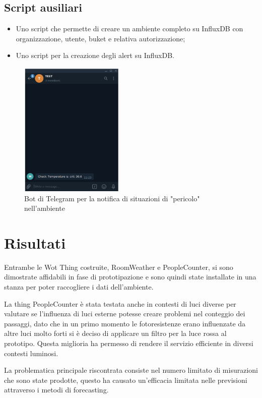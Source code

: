 \documentclass{article}
\begin{document}
\subsection{Script ausiliari}
\begin{itemize}
    \item Uno script che permette di creare un ambiente completo su InfluxDB con organizzazione, utente, buket e relativa autorizzazione;
    \item Uno script per la creazione degli alert su InfluxDB.
\end{itemize}



\begin{figure}
    \centering
    \includegraphics[width=5cm]{img/AlertBot.png}
    \caption{Bot di Telegram per la notifica di situazioni di "pericolo" nell'ambiente}
    \label{fig:influxForecast}
\end{figure}

\section{Risultati \label{section:risultati}}
Entrambe le Wot Thing costruite, RoomWeather e PeopleCounter, si sono dimostrate affidabili in fase di prototipazione e sono quindi state installate in una stanza per poter raccogliere i dati dell'ambiente. 
 
La thing PeopleCounter è stata testata anche in contesti di luci diverse per valutare se l'influenza di luci esterne potesse creare problemi nel conteggio dei passaggi, dato che in un primo momento le fotoresistenze erano influenzate da altre luci molto forti si è deciso di applicare un filtro per la luce rossa al prototipo. Questa miglioria ha permesso di rendere il servizio efficiente in diversi contesti luminosi.

La problematica principale riscontrata consiste nel numero limitato di misurazioni che sono state prodotte, questo ha causato un'efficacia limitata nelle previsioni attraverso i metodi di forecasting.
\end{document}
